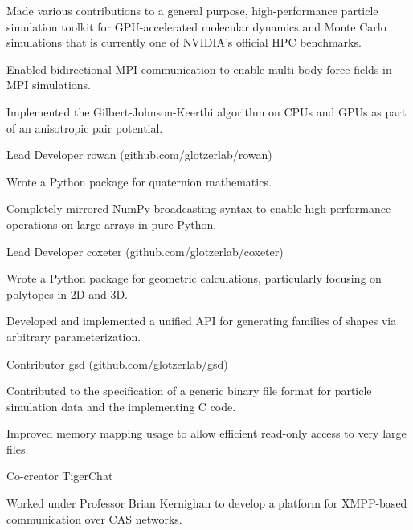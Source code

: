 \begin{cventries}
{\begin{cvitems}
        \item Made various contributions to a general purpose, high-performance particle simulation toolkit for GPU-accelerated molecular dynamics and Monte Carlo simulations that is currently one of NVIDIA's official HPC benchmarks.
        \item Enabled bidirectional MPI communication to enable multi-body force fields in MPI simulations.
        \item Implemented the Gilbert-Johnson-Keerthi algorithm on CPUs and GPUs as part of an anisotropic pair potential.
      \end{cvitems}
    }
  \cventry
    {Lead Developer} %
    {rowan ({\tiny github.com/glotzerlab/rowan})} %
    {} %
    {} %
{
      \begin{cvitems} %
        \item Wrote a Python package for quaternion mathematics.
        \item Completely mirrored NumPy broadcasting syntax to enable high-performance operations on large arrays in pure Python.
      \end{cvitems}
    }
  \cventry
    {Lead Developer} %
    {coxeter ({\tiny github.com/glotzerlab/coxeter})} %
    {} %
    {} %
{
      \begin{cvitems} %
        \item Wrote a Python package for geometric calculations, particularly focusing on polytopes in 2D and 3D.
        \item Developed and implemented a unified API for generating families of shapes via arbitrary parameterization.
      \end{cvitems}
    }
  \cventry
    {Contributor} %
    {gsd ({\tiny github.com/glotzerlab/gsd})} %
    {} %
    {} %
{
      \begin{cvitems} %
        \item Contributed to the specification of a generic binary file format for particle simulation data and the implementing C code.
        \item Improved memory mapping usage to allow efficient read-only access to very large files.
      \end{cvitems}
    }
  \cventry
    {Co-creator} %
    {TigerChat} %
    {} %
    {} %
{
      \begin{cvitems} %
        \item Worked under Professor Brian Kernighan to develop a platform for XMPP-based communication over CAS networks.
      \end{cvitems}
    }
\end{cventries}